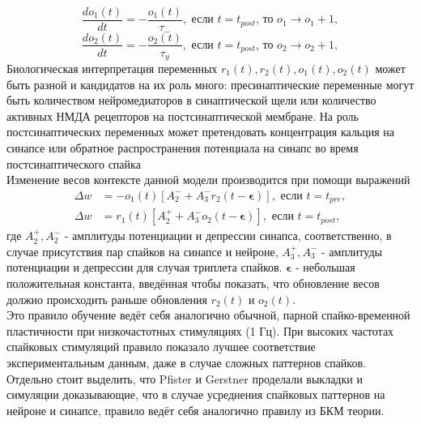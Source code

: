 \documentclass[a4paper,10pt]{article}
\begin{document}
\begin{equation}
\frac{do_{1}(t)}{dt} = -\frac{o_{1}(t)}{\tau_{-}}, \mbox{ если } t=t_{post}\mbox{, то }o_{1} \rightarrow o_{1} + 1,
\end{equation}
\begin{equation*}
\frac{do_{2}(t)}{dt} = -\frac{o_{2}(t)}{\tau_{y}}, \mbox{ если } t=t_{post}\mbox{, то }o_{2} \rightarrow o_{2} + 1,
\end{equation*}
\indent Биологическая интерпретация переменных $r_{1}(t),r_{2}(t), o_{1}(t), o_{2}(t)$ может быть разной и кандидатов на их роль много: пресинаптические переменные могут быть количеством нейромедиаторов в синаптической щели или количество активных НМДА рецепторов на постсинаптической мембране. На роль постсинаптических переменных может претендовать концентрация кальция на синапсе или обратное распространения потенциала на синапс во время постсинаптического спайка \\
\indent Изменение весов контексте данной модели производится при помощи выражений
\begin{equation}
\begin{split}
\Delta w &= - o_{1}(t)[A_{2}^{-}+A_{3}^{-}r_{2}(t-\boldsymbol{\epsilon})], \mbox{ если } t=t_{pre},\\
\Delta w &= r_{1}(t)[A_{2}^{+}+A_{3}^{-}o_{2}(t-\boldsymbol{\epsilon})], \mbox{ если } t=t_{post},
\end{split}
\end{equation}
где $A_{2}^{+},A_{2}^{-}$ - амплитуды потенциации и депрессии синапса, соответственно, в случае присутствия пар спайков на синапсе и нейроне, $A_{3}^{+},A_{3}^{-}$ - амплитуды потенциации и депрессии для случая триплета спайков. $\boldsymbol{\epsilon}$ - небольшая положительная константа, введённая чтобы показать, что обновление весов должно происходить раньше обновления $r_{2}(t)$ и  $o_{2}(t)$.\\
\indent Это правило обучение ведёт себя аналогично обычной, парной спайко-временной пластичности при низкочастотных стимуляциях (1 Гц). При высоких частотах спайковых стимуляций правило показало лучшее соответствие экспериментальным данным, даже в случае сложных паттернов спайков.\\
\indent Отдельно стоит выделить, что Pfister и Gerstner проделали выкладки и симуляции доказывающие, что в случае усреднения спайковых паттернов на нейроне и синапсе, правило ведёт себя аналогично правилу из БКМ теории.\\
\end{document}
